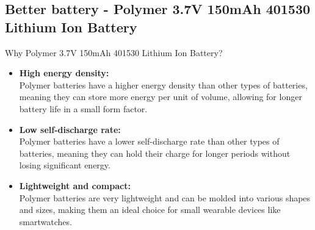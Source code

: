 \documentclass{article}
\begin{document}
        \subsection{Better battery - Polymer 3.7V 150mAh 401530 Lithium Ion Battery}

        \begin{figure}[!htb]
                \centering
            \end{figure}

        Why Polymer 3.7V 150mAh 401530 Lithium Ion Battery?

        \begin{itemize}
            \item \textbf{High energy density:} \\
            Polymer batteries have a higher energy density than other types of batteries, meaning they can store more energy per unit of volume, allowing for longer battery life in a small form factor.

            \item \textbf{Low self-discharge rate:} \\
            Polymer batteries have a lower self-discharge rate than other types of batteries, meaning they can hold their charge for longer periods without losing significant energy.

            \item \textbf{Lightweight and compact:}\\ 
            Polymer batteries are very lightweight and can be molded into various shapes and sizes, making them an ideal choice for small wearable devices like smartwatches.
        \end{itemize}
\end{document}
